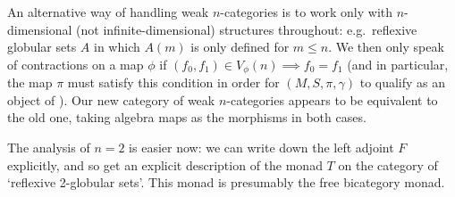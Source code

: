 
An alternative way of handling weak $n$-categories is to work only with
$n$-dimensional (not infinite-dimensional) structures throughout: e.g.\
reflexive globular sets $A$ in which $A(m)$ is only defined for $m\leq n$.
We then only speak of contractions on a map $\phi$ if $(f_0,f_1) \in
V_\phi(n) \implies f_0=f_1$ (and in particular, the map $\pi$ must satisfy
this condition in order for $(M,S,\pi,\gamma)$ to qualify as an object of
\cat{Q}).  Our new category of weak $n$-categories appears to be equivalent
to the old one, taking algebra maps as the morphisms in both cases.

The analysis of $n=2$ is easier now: we can write down the left adjoint $F$
explicitly, and so get an explicit description of the monad $T$ on the
category of `reflexive 2-globular sets'.  This monad is presumably the free
bicategory monad.

\clearpage



